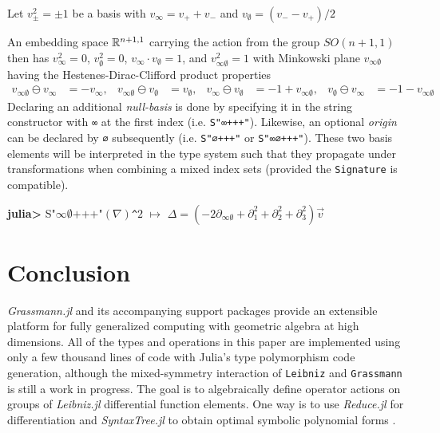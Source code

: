 \documentclass{juliacon}
\begin{document}
\begin{definition}
	Let $v_\pm^2 = \pm1$ be a basis with $v_\infty = v_++v_-$ and $v_\emptyset = (v_--v_+)/2$
\end{definition}
An embedding space $\mathbb{R}^{n+1,1}$ carrying the action from the group $SO(n+1,1)$ then has
$v_\infty^2 =0$, $v_\emptyset^2 =0$,
$v_\infty \cdot v_\emptyset = 1$,  and $v_{\infty\emptyset}^2 = 1$ with
Minkowski plane $v_{\infty\emptyset}$ having the Hestenes-Dirac-Clifford product properties
\begin{align*}
	v_{\infty\emptyset}\ominus v_\infty &= -v_\infty, &  v_{\infty\emptyset}\ominus v_\emptyset &= v_\emptyset, &
	v_\infty\ominus v_\emptyset &= -1 + v_{\infty\emptyset}, & v_\emptyset\ominus v_\infty &=  -1 - v_{\infty\emptyset}
\end{align*}
Declaring an additional \textit{null-basis} is done by specifying it in the string constructor with \verb`∞` at the first index (i.e. \verb`S"∞+++"`). Likewise, an optional \textit{origin} can be declared by \verb`∅` subsequently (i.e. \verb`S"∅+++"` or \verb`S"∞∅+++"`). These two basis elements will be interpreted in the type system such that they propagate under transformations when combining a mixed index sets (provided the \verb`Signature` is compatible).
\begin{example}
	\textbf{julia>} S"$\infty\emptyset\text{+++"}(\nabla)$\verb`^`$2 \,\,  \mapsto\, \, \Delta = (-2\partial_{\infty\emptyset} + \partial_1^2 + \partial_2^2 + \partial_3^2)\vec v $
\end{example}

\section{Conclusion}

\textit{Grassmann.jl} and its accompanying support packages provide an extensible platform for fully generalized computing with geometric algebra at high dimensions.
All of the types and operations in this paper are implemented using only a few thousand lines of code with Julia's type polymorphism code generation, although the mixed-symmetry interaction of \verb`Leibniz` and \verb`Grassmann` is still a work in progress.
The goal is to algebraically define operator actions on groups of \textit{Leibniz.jl} differential function elements. 
One way is to use \textit{Reduce.jl} for differentiation and \textit{SyntaxTree.jl} to obtain optimal symbolic polynomial forms \cite{optim-poly}.
\end{document}
